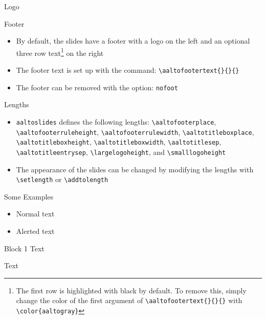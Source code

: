 \documentclass[first=red,second=purple,logo=yellowexc]{aaltoslides}
\begin{document}
\begin{frame}{Logo}
\end{frame}


\begin{frame}{Footer}

\begin{itemize}

\item By default, the slides have a footer with a logo on the left and an optional three row text\footnote{The first row is highlighted with black by default. To remove this, simply change the color of the first argument of  \texttt{\textbackslash aaltofootertext\{\}\{\}\{\}} with \texttt{\textbackslash color\{aaltogray\}}} on the right
\item The footer text is set up with the command: \texttt{\textbackslash aaltofootertext\{\}\{\}\{\}}
\item The footer can be removed with the option: \texttt{nofoot}

\end{itemize}

\end{frame}


\begin{frame}{Lengths}

\begin{itemize}
\item \texttt{aaltoslides} defines the following lengths: 
\texttt{\textbackslash aaltofooterplace}, 
\texttt{\textbackslash aaltofooterruleheight}, 
\texttt{\textbackslash aaltofooterrulewidth}, 
\texttt{\textbackslash aaltotitleboxplace},  
\texttt{\textbackslash aaltotitleboxheight}, 
\texttt{\textbackslash aaltotitleboxwidth}, 
\texttt{\textbackslash aaltotitlesep}, 
\texttt{\textbackslash aaltotitleentrysep}, 
\texttt{\textbackslash largelogoheight}, and
\texttt{\textbackslash smalllogoheight} 
\item The appearance of the slides can be changed by modifying the lengths with \texttt{\textbackslash setlength} or \texttt{\textbackslash addtolength}
\end{itemize}

\end{frame}



\begin{frame}{Some Examples}

\begin{itemize}
\item Normal text
\item \alert{Alerted text}
\end{itemize}

\begin{block}{Block 1}
Text
\end{block}

\begin{example}
Text
\end{example}

\end{frame}

\end{document}
